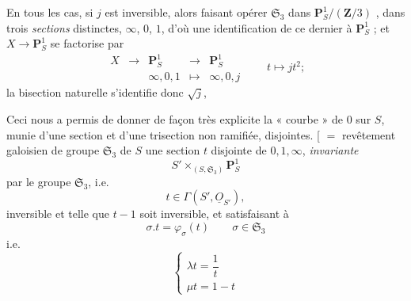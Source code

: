 \documentclass[11pt,a4paper]{article}
\begin{document}
\struck{\ill{}} En tous les cas, si $j$ est inversible, alors faisant opérer
$\mathfrak{S}_3$ dans $\mathbf{P}^1_S/(\mathbf{Z}/3)$ ,  dans \struck{\ill{}}   trois \emph{sections} distinctes,
 $\infty$, $0$, $1$, d'où une identification de
ce dernier à $\mathbf{P}^1_S$ ; et $X\to\mathbf{P}^1_S$ se factorise par
\[
\begin{array}{ccccc}
X & \longrightarrow & \mathbf{P}^1_S & \longrightarrow & \mathbf{P}^1_S \\
 & & \infty,0,1 & \longmapsto & \infty,0,j
\end{array}
\qquad t\mapsto jt^2 ;
\]
la bisection naturelle  s'identifie donc  $\sqrt{j}$,

\struck{\ill{}} 

Ceci nous a permis de donner de façon très explicite \ill{}  la
« courbe \add{\ill{}} » de  $0$ sur $S$, munie d'une section et
d'une trisection non ramifiée, disjointes. [\struck{\ill{}} $=$ revêtement
 \struck{\ill{}} galoisien  de groupe
$\mathfrak{S}_3$ de $S$ \struck{\ill{}}  une section $t$ \struck{\ill{}}
disjointe de $0,1,\infty$, \emph{invariante}
\struck{\ill{}}
\[
S'\times_{(S,\mathfrak{S}_3)}\mathbf{P}^1_S
\]
par le groupe $\mathfrak{S}_3$, i.e.\ 
\[
t\in\Gamma(S',\underline{O}_{S'}),
\]
inversible et telle que $t-1$ soit inversible, et satisfaisant à
\[
\sigma.t = \varphi_\sigma(t) \qquad \sigma\in\mathfrak{S}_3
\]
i.e.
\[
\begin{cases} \lambda t = \dfrac{1}{t} \\[1ex] \mu t = 1-t \end{cases}
\]

\end{document}
